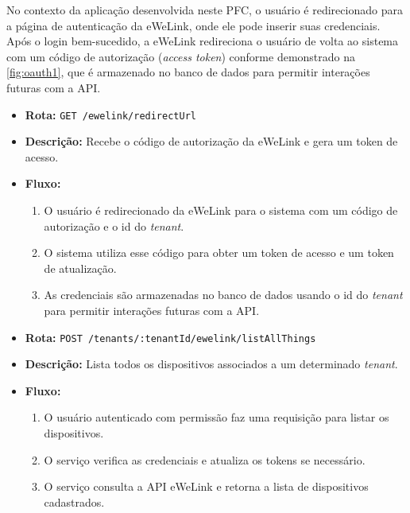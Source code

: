 No contexto da aplicação desenvolvida neste PFC, o usuário é redirecionado para a página de autenticação da eWeLink, onde ele pode inserir suas credenciais. Após o login bem-sucedido, a eWeLink redireciona o usuário de volta ao sistema com um código de autorização (\textit{access token}) conforme demonstrado na \autoref{fig:oauth1}, que é armazenado no banco de dados para permitir interações futuras com a API.

\begin{itemize}
    \item \textbf{Rota:} \texttt{GET /ewelink/redirectUrl}
    \item \textbf{Descrição:} Recebe o código de autorização da eWeLink e gera um token de acesso.
    \item \textbf{Fluxo:}
    \begin{enumerate}
        \item O usuário é redirecionado da eWeLink para o sistema com um código de autorização e o id do \textit{tenant}.
        \item O sistema utiliza esse código para obter um token de acesso e um token de atualização.
        \item As credenciais são armazenadas no banco de dados usando o id do \textit{tenant} para permitir interações futuras com a API.
    \end{enumerate}
\end{itemize}

\begin{itemize}
    \item \textbf{Rota:} \texttt{POST /tenants/:tenantId/ewelink/listAllThings}
    \item \textbf{Descrição:} Lista todos os dispositivos associados a um determinado \textit{tenant}.
    \item \textbf{Fluxo:}
    \begin{enumerate}
        \item O usuário autenticado com permissão faz uma requisição para listar os dispositivos.
        \item O serviço verifica as credenciais e atualiza os tokens se necessário.
        \item O serviço consulta a API eWeLink e retorna a lista de dispositivos cadastrados.
    \end{enumerate}
\end{itemize}

